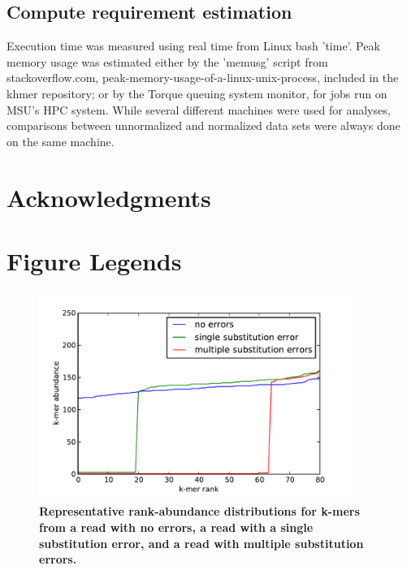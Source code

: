 \documentclass[10pt]{article}
\begin{document}
\subsection*{Compute requirement estimation}

Execution time was measured using real time from Linux bash 'time'.
Peak memory usage was estimated either by the 'memusg' script from
stackoverflow.com, peak-memory-usage-of-a-linux-unix-process, included
in the khmer repository; or by the Torque queuing system monitor, for
jobs run on MSU's HPC system.  While several different machines were
used for analyses, comparisons between unnormalized and normalized
data sets were always done on the same machine.

\section*{Acknowledgments}








\newpage

\section*{Figure Legends}

\begin{figure}
\centerline{\includegraphics[width=4in]{diginorm-ranks.pdf}}
\caption{
{\bf Representative rank-abundance distributions for k-mers from a read with no errors,
a read with a single substitution error, and a read with multiple
substitution errors.}}
\label{fig:rankabund}
\end{figure}
\end{document}
